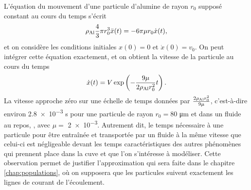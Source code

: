 \begin{remarque}
  L'équation du mouvement d'une particule d'alumine de rayon $r_0$
  supposé constant au cours du temps s'écrit
  \begin{equation*}
    \rho_\mathrm{Al} \frac{4}{3}\pi r_0^3 \ddot x(t) = -
    6\pi\mu r_0 \dot x(t),
  \end{equation*}
  et on considère les conditions initiales $x(0) = 0$ et $\dot x(0) =
  v_0$. On peut intégrer cette équation exactement, et on obtient la
  vitesse de la particule au cours du temps
  \begin{equation*}
    \dot x(t) = V\exp\left( -\frac{9\mu}{2\rho_\mathrm{Al} r_0^2}t \right).
  \end{equation*}
  La vitesse approche zéro sur une échelle de temps données par
  $\frac{2\rho_\mathrm{Al} r_0^2}{9\mu}$,
  c'est-à-dire environ \num{2.8e-3} \si{\second} pour une particule de rayon $r_0 =
  \num{80}$ \si{\micro\meter} et dans un fluide au repos, \ie, avec $\mu
  = $ \num{2e-3}. Autrement dit, le temps nécessaire à une particule
  pour être entraînée et transportée par un fluide à la même vitesse
  que celui-ci est négligeable devant les temps caractéristiques des
  autres phénomènes qui prennent place dans la cuve et que l'on
  s'intéresse à modéliser. Cette observation permet de justifier
  l'approximation qui sera faite dans le chapitre
  \ref{chap:populations}, où on supposera que les particules suivent
  exactement les lignes de courant de l'écoulement.
\end{remarque}

